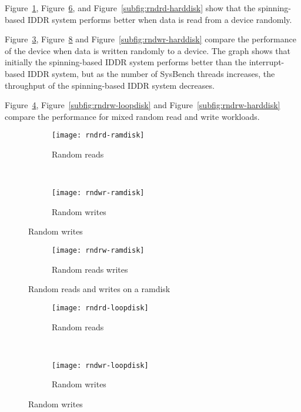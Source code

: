 Figure~\ref{subfig:rndrd-ramdisk}, Figure~\ref{subfig:rndrd-loopdisk},
and Figure~\ref{subfig:rndrd-harddisk} show that the spinning-based IDDR
system performs better when data is read from a device randomly.

Figure~\ref{subfig:rndwr-ramdisk}, Figure~\ref{subfig:rndwr-loopdisk}
and Figure~\ref{subfig:rndwr-harddisk} compare the performance of
the device when data is written randomly to a device. The graph shows
that initially the spinning-based IDDR system performs better than the
interrupt-based IDDR system, but as the number of SysBench threads increases,
the throughput of the spinning-based IDDR system decreases.

Figure~\ref{subfig:rndrw-ramdisk}, Figure~\ref{subfig:rndrw-loopdisk}
and Figure~\ref{subfig:rndrw-harddisk} compare the performance for mixed
random read and write workloads.

\begin{figure}[!ht]
 \centering
  \begin{subfigure}[b]{\textwidth}
  \texttt{[image: rndrd-ramdisk]}
  \caption{Random reads}
  \label{subfig:rndrd-ramdisk}
  \end{subfigure}\\
  \begin{subfigure}[b]{\textwidth}
  \texttt{[image: rndwr-ramdisk]}
  \caption{Random writes}
  \label{subfig:rndwr-ramdisk}
  \end{subfigure}
\end{figure}

\begin{figure}[H]
  \ContinuedFloat
  \begin{subfigure}[b]{\textwidth}
  \texttt{[image: rndrw-ramdisk]}
  \caption{Random reads writes}
  \label{subfig:rndrw-ramdisk}
  \end{subfigure}
  \caption{Random reads and writes on a ramdisk}\label{fig:rndramdisk}
\end{figure}

\begin{figure}[!ht]
\centering
  \begin{subfigure}[b]{\textwidth}
  \texttt{[image: rndrd-loopdisk]}
  \caption{Random reads}
  \label{subfig:rndrd-loopdisk}
  \end{subfigure}\\
  \begin{subfigure}[b]{\textwidth}
  \texttt{[image: rndwr-loopdisk]}
  \caption{Random writes}
  \label{subfig:rndwr-loopdisk}
  \end{subfigure}
\end{figure}

